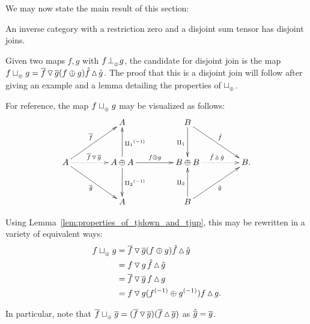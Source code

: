 We may now state the main result of this section:
\begin{proposition}\label{prop:disjointness_tensor_gives_disjoint_join}
  An inverse category with a restriction zero and a disjoint sum tensor has disjoint joins.
\end{proposition}

Given two  maps $f,g$ with $f{}_{{}_{}}{\perp_{{}_{\oplus}}} g$, the candidate for disjoint join is  the map
$f \sqcup_{{_{\oplus}}} g = \overline{f}\operatorname{\triangledown}\overline{g} (f\oplus g) \hat{f}\operatorname{\vartriangle}\hat{g}$. The proof that this is a disjoint
join will follow  after giving an example and a lemma detailing the properties of $\sqcup_{{_{\oplus}}}$.

For reference, the map $f \sqcup_{{_{\oplus}}} g$ may be visualized as follows:
\[
  \xymatrix@C+20pt @R+10pt{
    &A
      & B  \ar[dr]^{\rg{f}} \ar[d]_{\cpa}\\
    A \ar[ur]^{\rst{f}} \ar@{.>}[r]^{\rst{f}\tjdown \rst{g}} \ar[dr]_{\rst{g}}
      & A\+A \ar[u]_{\icpa} \ar[d]^{\icpb}
        \ar[r]^{f\+g}
       &B\+B \ar@{.>}[r]^{\rg{f}\tjup\rg{g}} & B.\\
    & A & B\ar[ur]_{\rg{g}} \ar[u]^{\cpb}
  }
\]

Using Lemma~\ref{lem:properties_of_tjdown_and_tjup}, this may be rewritten in a variety of
equivalent ways:
\begin{align*}
  f \sqcup_{{_{\oplus}}} g &= \overline{f}\operatorname{\triangledown}\overline{g} (f\oplus g) \hat{f}\operatorname{\vartriangle}\hat{g} \\
  &= f \operatorname{\triangledown} g\, \hat{f}\operatorname{\vartriangle}\hat{g}\\
  & = \overline{f}\operatorname{\triangledown}\overline{g}\,  f\operatorname{\vartriangle} g\\
  & = f \operatorname{\triangledown} g ({f}^{(-1)}\oplus{g}^{(-1)})f\operatorname{\vartriangle} g.
\end{align*}

In particular, note that $\overline{f}\sqcup_{{_{\oplus}}} \overline{g} = (\overline{f} \operatorname{\triangledown} \overline{g})
(\overline{f}\operatorname{\vartriangle}\overline{g})$ as $\hat{\overline{g}} = \overline{g}$.

